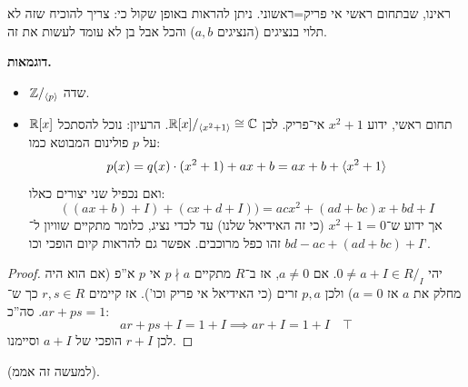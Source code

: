 \documentclass[]{../../../../tex/classes/styledArticle}
\begin{document}
    \section{}
    ראינו, שבתחום ראשי אי פריק=ראשוני. ניתן להראות באופן שקול כי: 
    צריך להוכיח שזה לא תלוי בנציגים (הנציגים $a, b$) והכל אבל בן לא עומד לעשות את זה. 
    
    \textbf{דוגמאות. }
    \begin{itemize}
        \item $\mathbb{Z}/_{\langle p \rangle}$ שדה. 
        \item $\mathbb{R}[x]$ תחום ראשי, ידוע $x^2 + 1$ אי־פריק. לכן $\mathbb{R}[x]/_{\langle x^2 + 1\rangle}\cong \mathbb{C}$. הרעיון: נוכל להסתכל על $p$ פולינום המבוטא כמו: 
        \[ p(x) = q(x) \cdot (x^2 + 1) + ax + b = ax +b + \langle x^2 + 1\rangle \]
        ואם נכפיל שני יצורים כאלו: 
        \[ ((ax + b) + I) + (cx + d + I)) = acx^2 + (ad + bc)x + bd + I \]
        אך ידוע ש־$x^2 + 1 = 0$ (כי זה האידיאל שלנו) עד לכדי נציג, כלומר מתקיים שוויון ל־$bd - ac + (ad + bc) + I$ זהו כפל מרוכבים. אפשר גם להראות קיום הופכי וכו'. 
    \end{itemize}
    \begin{proof}
        יהי $0 \neq a + I \in R/_I$. אם $a \neq 0$, אז ב־$R$ מתקיים $p \nmid a$ אי $p$ א''פ (אם הוא היה מחלק את $a$ אז $a = 0$) ולכן $p, a$ זרים (כי האידיאל אי פריק וכו'). אז קיימים $r, s \in R$ כך ש־$ar + ps = 1$. סה''כ: 
        \[ ar + ps + I = 1 + I \implies ar + I = 1 + I \quad \top \]
        לכן $r + I$ הופכי של $a + I$ וסיימנו. 
    \end{proof}
    (למעשה זה אממ). 
    
    
    \ndoc
\end{document}
